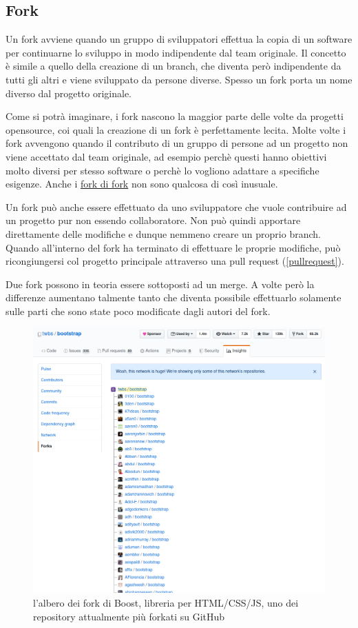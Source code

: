 \documentclass{article} \usepackage[textwidth=19cm,textheight=24cm]{geometry}
\begin{document}
\subsection{Fork\label{fork}}
Un fork avviene quando un gruppo di sviluppatori effettua la copia di un
software per continuarne lo sviluppo in modo indipendente dal team originale. Il
concetto è simile a quello della creazione di un branch, che diventa però
indipendente da tutti gli altri e viene sviluppato da persone diverse.
Spesso un fork porta un nome diverso dal progetto originale.

Come si potrà imaginare, i fork nascono la maggior parte delle volte da progetti
opensource, coi quali la creazione di un fork è perfettamente lecita.
Molte volte i fork avvengono quando il contributo di un gruppo di persone ad un
progetto non viene accettato dal team originale, ad esempio perchè questi
hanno obiettivi molto diversi per stesso software o perchè lo vogliono adattare
a specifiche esigenze.
Anche i 
\href{https://en.wikipedia.org/wiki/Fork_(software_development)#/media/File:Linux_Distribution_Timeline.svg}
{fork di fork}
non sono qualcosa di così inusuale.

Un fork può anche essere effettuato da uno sviluppatore che vuole contribuire ad
un progetto pur non essendo collaboratore. Non può quindi apportare direttamente
delle modifiche e dunque nemmeno creare un proprio branch.
Quando all'interno del fork ha terminato di effettuare le proprie modifiche, può
ricongiungersi col progetto principale attraverso una pull request
({\ref{pullrequest}}).

Due fork possono in teoria essere sottoposti ad un merge. A volte però la
differenze aumentano talmente tanto che diventa possibile effettuarlo
solamente sulle parti che sono state poco modificate dagli autori del fork.

\begin{figure}
\includegraphics[width=6in]{img/fork.png}
\centering
\caption{l'albero dei fork di Boost, libreria per HTML/CSS/JS, uno dei repository attualmente più forkati su GitHub}
\end{figure}
\end{document}
